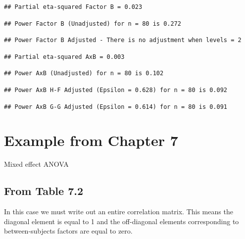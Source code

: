 \documentclass[
]{book}
\begin{document}
\begin{verbatim}
## Partial eta-squared Factor B = 0.023
\end{verbatim}

\begin{verbatim}
## Power Factor B (Unadjusted) for n = 80 is 0.272
\end{verbatim}

\begin{verbatim}
## Power Factor B Adjusted - There is no adjustment when levels = 2
\end{verbatim}

\begin{verbatim}
## Partial eta-squared AxB = 0.003
\end{verbatim}

\begin{verbatim}
## Power AxB (Unadjusted) for n = 80 is 0.102
\end{verbatim}

\begin{verbatim}
## Power AxB H-F Adjusted (Epsilon = 0.628) for n = 80 is 0.092
\end{verbatim}

\begin{verbatim}
## Power AxB G-G Adjusted (Epsilon = 0.614) for n = 80 is 0.091
\end{verbatim}

\hypertarget{example-from-chapter-7}{%
\section{Example from Chapter 7}\label{example-from-chapter-7}}

Mixed effect ANOVA

\hypertarget{from-table-7.2}{%
\subsection{From Table 7.2}\label{from-table-7.2}}

In this case we must write out an entire correlation matrix.
This means the diagonal element is equal to 1 and the off-diagonal elements corresponding to between-subjects factors are equal to zero.
\end{document}
